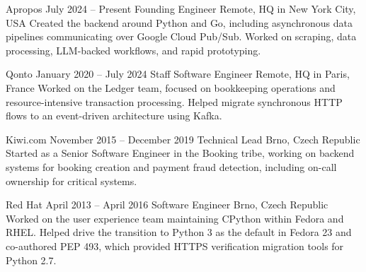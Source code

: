 \documentclass[letterpaper,11pt]{article}
\begin{document}




\cvjob
    {Apropos}
    {July 2024 -- Present}
    {Founding Engineer}
    {Remote, HQ in New York City, USA}
  {
    Created the backend around Python and Go, including asynchronous data
    pipelines communicating over Google Cloud Pub/Sub. Worked on scraping,
    data processing, LLM-backed workflows, and rapid prototyping.
  }

\cvjob
    {Qonto}
    {January 2020 -- July 2024}
    {Staff Software Engineer}
    {Remote, HQ in Paris, France}
  {
    Worked on the Ledger team, focused on bookkeeping operations and
    resource-intensive transaction processing. Helped migrate synchronous
    HTTP flows to an event-driven architecture using Kafka.
  }

\cvjob
    {Kiwi.com}
    {November 2015 -- December 2019}
    {Technical Lead}
    {Brno, Czech Republic}
  {
    Started as a Senior Software Engineer in the Booking tribe, working on
    backend systems for booking creation and payment fraud detection, including
    on-call ownership for critical systems.
  }

\cvjob
    {Red Hat}
    {April 2013 -- April 2016}
    {Software Engineer}
    {Brno, Czech Republic}
  {
    Worked on the user experience team maintaining CPython within Fedora and
    RHEL. Helped drive the transition to Python 3 as the default in Fedora 23
    and co-authored PEP 493, which provided HTTPS verification migration tools
    for Python 2.7.
  }
\end{document}
